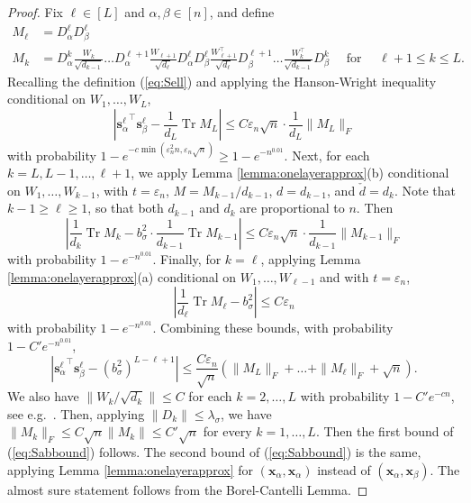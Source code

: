 \documentclass{article}
\theoremstyle{definition}
\newcommand{\Tr}{\operatorname{Tr}}
\newcommand{\x}{\mathbf{x}}
\newcommand{\s}{\mathbf{s}}
\renewcommand{\a}{\alpha}
\renewcommand{\b}{\beta}
\newcommand{\eps}{\varepsilon}
\newcommand{\vd}{\check{d}}
\newcommand{\1}{\mathbf{1}}
\begin{document}
\begin{proof}
Fix $\ell \in [L]$ and $\a,\b \in [n]$, and define
\begin{align}
M_\ell&=D_\a^\ell D_\b^\ell\nonumber\\
M_k&=D_\a^k\frac{W_k}{\sqrt{d_{k-1}}}
\ldots D_\a^{\ell+1}\frac{W_{\ell+1}}{\sqrt{d_\ell}}D_\a^\ell D_\b^\ell
\frac{W_{\ell+1}^\top}{\sqrt{d_\ell}}D_\b^{\ell+1}\ldots
\frac{W_k^\top}{\sqrt{d_{k-1}}}D_\b^k \quad \text{ for }
\quad \ell+1 \leq k \leq L.\label{eq:Mell}
\end{align}
Recalling the definition (\ref{eq:Sell}) and applying the
Hanson-Wright inequality conditional on $W_1,\ldots,W_L$,
\begin{equation}\label{eq:HansonWright}
\left|{\s_\a^\ell}^\top \s_\b^\ell-\frac{1}{d_L}\Tr M_L\right|
\leq C\eps_n\sqrt{n} \cdot \frac{1}{d_L}\|M_L\|_F
\end{equation}
with probability $1-e^{-c\min(\eps_n^2n,\eps_n\sqrt{n})}
\geq 1-e^{-n^{0.01}}$. Next, for each
$k=L,L-1,\ldots,\ell+1$,
we apply Lemma \ref{lemma:onelayerapprox}(b) conditional on
$W_1,\ldots,W_{k-1}$, with $t=\eps_n$, $M=M_{k-1}/d_{k-1}$,
$d=d_{k-1}$, and $\vd=d_k$. Note that $k-1 \geq \ell \geq 1$, so that both
$d_{k-1}$ and $d_k$ are proportional to $n$. Then
\[\left|\frac{1}{d_k}\Tr M_k-b_\sigma^2 \cdot
\frac{1}{d_{k-1}}\Tr M_{k-1}\right|
\leq C\eps_n \sqrt{n} \cdot \frac{1}{d_{k-1}}\|M_{k-1}\|_F\]
with probability $1-e^{-n^{0.01}}$.
Finally, for $k=\ell$, applying Lemma \ref{lemma:onelayerapprox}(a) conditional
on $W_1,\ldots,W_{\ell-1}$ and with $t=\eps_n$,
\[\left|\frac{1}{d_\ell}\Tr M_\ell-b_\sigma^2\right| \leq C\eps_n\]
with probability $1-e^{-n^{0.01}}$. Combining these bounds, with probability
$1-C'e^{-n^{0.01}}$,
\[\left|{\s_\a^\ell}^\top \s_\b^\ell-(b_\sigma^2)^{L-\ell+1}\right|
\leq \frac{C\eps_n}{\sqrt{n}}\left(
\|M_L\|_F+\ldots+\|M_\ell\|_F+\sqrt{n}\right).\]
We also have $\|W_k/\sqrt{d_k}\| \leq C$ for each $k=2,\ldots,L$
with probability $1-C'e^{-cn}$, see e.g.\ \cite[Theorem
4.4.5]{vershynin2018high}. 
Then, applying $\|D_k\| \leq \lambda_\sigma$, we have
$\|M_k\|_F \leq C\sqrt{n}\|M_k\| \leq C'\sqrt{n}$ for every $k=1,\ldots,L$.
Then the first bound of (\ref{eq:Sabbound}) follows. The second bound of
(\ref{eq:Sabbound}) is the same, applying
Lemma \ref{lemma:onelayerapprox} for $(\x_\a,\x_\a)$ instead of $(\x_\a,\x_\b)$.
The almost sure statement follows from the Borel-Cantelli Lemma.
\end{proof}
\end{document}
